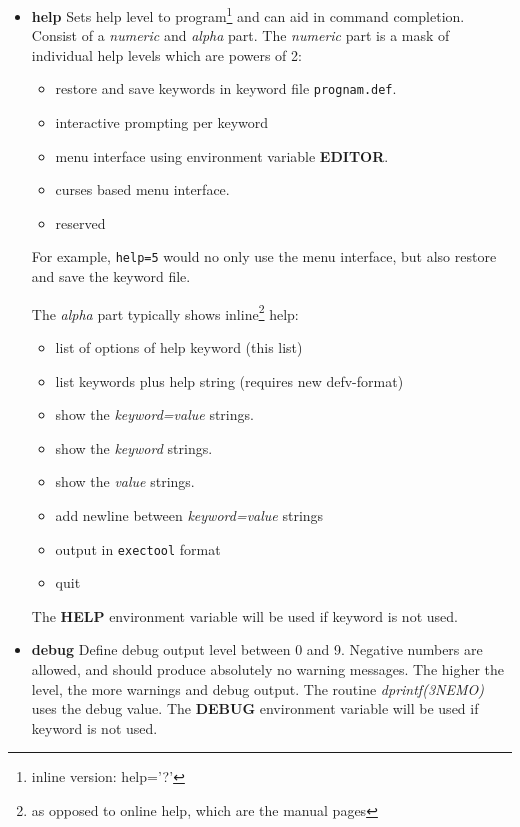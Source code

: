 \begin{itemize}
\item {\bf help} Sets help level to program\footnote{inline version: help='?'}
and can aid in command
completion. Consist of a {\it numeric} and {\it alpha} part. The 
{\it numeric} part is a mask of individual help levels which are powers
of 2:
  \begin{itemize}
  \item[1.] restore and save keywords in keyword file {\tt prognam.def}.
  \item[2.] interactive prompting per keyword
  \item[4.] menu interface using environment variable {\bf EDITOR}.
  \item[8.] curses based menu interface.
  \item[16.] reserved
  \end{itemize}
For example, {\tt help=5} would no only use the menu interface, but
also restore and save the keyword file.
   
The {\it alpha} part typically shows 
inline\footnote{as opposed to online help, which are the manual pages}
help:
  \begin{itemize}
  \item[?]  list of options of help keyword (this list)
  \item[h]  list keywords plus help string (requires new defv-format)
  \item[a]  show the {\it keyword=value} strings.
  \item[p,k] show the {\it keyword} strings.
  \item[d,v] show the {\it value} strings.
  \item[n]  add newline between {\it keyword=value} strings
  \item[t]  output in {\tt exectool} format
  \item[q]  quit
  \end{itemize}
The {\bf HELP}
environment variable will be used if keyword is not used.


\item {\bf debug} Define debug output level between 0 and 9. Negative
numbers are allowed, and should produce absolutely no warning messages.
The higher the level, the more warnings and debug output. The
routine {\it dprintf(3NEMO)} uses the debug value. The {\bf DEBUG}
environment variable will be used if keyword is not used.


\end{itemize}
